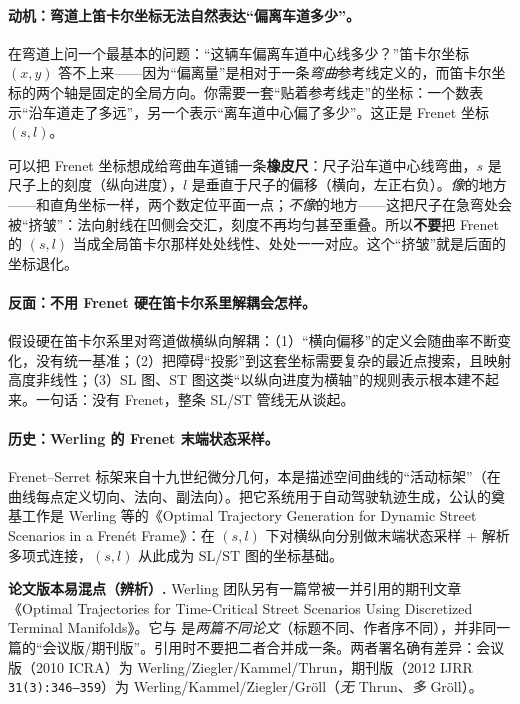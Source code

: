 \paragraph{动机：弯道上笛卡尔坐标无法自然表达“偏离车道多少”。}
在弯道上问一个最基本的问题：“这辆车偏离车道中心线多少？”笛卡尔坐标 $(x,y)$ 答不上来——因为“偏离量”是相对于一条\emph{弯曲}参考线定义的，而笛卡尔坐标的两个轴是固定的全局方向。你需要一套“贴着参考线走”的坐标：一个数表示“沿车道走了多远”，另一个表示“离车道中心偏了多少”。这正是 Frenet 坐标 $(s,l)$。

\begin{insight}
可以把 Frenet 坐标想成给弯曲车道铺一条\textbf{橡皮尺}：尺子沿车道中心线弯曲，$s$ 是尺子上的刻度（纵向进度），$l$ 是垂直于尺子的偏移（横向，左正右负）。\emph{像}的地方——和直角坐标一样，两个数定位平面一点；\emph{不像}的地方——这把尺子在急弯处会被“挤皱”：法向射线在凹侧会交汇，刻度不再均匀甚至重叠。所以\textbf{不要}把 Frenet 的 $(s,l)$ 当成全局笛卡尔那样处处线性、处处一一对应。这个“挤皱”就是后面的坐标退化。
\end{insight}

\paragraph{反面：不用 Frenet 硬在笛卡尔系里解耦会怎样。}
假设硬在笛卡尔系里对弯道做横纵向解耦：（1）“横向偏移”的定义会随曲率不断变化，没有统一基准；（2）把障碍“投影”到这套坐标需要复杂的最近点搜索，且映射高度非线性；（3）SL 图、ST 图这类“以纵向进度为横轴”的规则表示根本建不起来。一句话：没有 Frenet，整条 SL/ST 管线无从谈起。

\paragraph{历史：Werling 的 Frenet 末端状态采样。}
Frenet--Serret 标架来自十九世纪微分几何，本是描述空间曲线的“活动标架”（在曲线每点定义切向、法向、副法向）。把它系统用于自动驾驶轨迹生成，公认的奠基工作是 Werling 等的《Optimal Trajectory Generation for Dynamic Street Scenarios in a Frenét Frame》\cite{werling2010frenet}：在 $(s,l)$ 下对横纵向分别做末端状态采样 + 解析多项式连接，$(s,l)$ 从此成为 SL/ST 图的坐标基础。

\begin{note}
\textbf{论文版本易混点（辨析）.}\;
Werling 团队另有一篇常被一并引用的期刊文章《Optimal Trajectories for Time-Critical Street Scenarios Using Discretized Terminal Manifolds》\cite{werling2012optimal}。它与 \cite{werling2010frenet} 是\emph{两篇不同论文}（标题不同、作者序不同），并非同一篇的“会议版/期刊版”。引用时不要把二者合并成一条。两者署名确有差异：会议版（2010 ICRA）为 Werling/Ziegler/Kammel/Thrun，期刊版（2012 IJRR \texttt{31(3):346--359}）为 Werling/Kammel/Ziegler/Gröll（\emph{无} Thrun、\emph{多} Gröll）。
\end{note}


